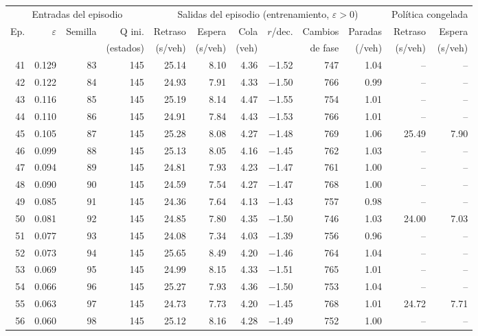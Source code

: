 \begin{table}[H]
\centering
\scriptsize
\setlength{\tabcolsep}{3pt}
\begin{tabular}{rrrrrrrrrrrr}
\toprule
\multicolumn{4}{c}{Entradas del episodio} & \multicolumn{6}{c}{Salidas del episodio (entrenamiento, $\varepsilon>0$)} & \multicolumn{2}{c}{Política congelada} \\
\cmidrule(lr){1-4}\cmidrule(lr){5-10}\cmidrule(lr){11-12}
Ep. & $\varepsilon$ & Semilla & Q ini. & Retraso & Espera & Cola & $r$/dec. & Cambios & Paradas & Retraso & Espera \\
 &  &  & (estados) & (s/veh) & (s/veh) & (veh) &  & de fase & (/veh) & (s/veh) & (s/veh) \\
\midrule
41 & 0.129 & 83 & 145 & 25.14 & 8.10 & 4.36 & $-$1.52 & 747 & 1.04 & -- & -- \\
42 & 0.122 & 84 & 145 & 24.93 & 7.91 & 4.33 & $-$1.50 & 766 & 0.99 & -- & -- \\
43 & 0.116 & 85 & 145 & 25.19 & 8.14 & 4.47 & $-$1.55 & 754 & 1.01 & -- & -- \\
44 & 0.110 & 86 & 145 & 24.91 & 7.84 & 4.43 & $-$1.53 & 766 & 1.01 & -- & -- \\
45 & 0.105 & 87 & 145 & 25.28 & 8.08 & 4.27 & $-$1.48 & 769 & 1.06 & 25.49 & 7.90 \\
46 & 0.099 & 88 & 145 & 25.13 & 8.05 & 4.16 & $-$1.45 & 762 & 1.03 & -- & -- \\
47 & 0.094 & 89 & 145 & 24.81 & 7.93 & 4.23 & $-$1.47 & 761 & 1.00 & -- & -- \\
48 & 0.090 & 90 & 145 & 24.59 & 7.54 & 4.27 & $-$1.47 & 768 & 1.00 & -- & -- \\
49 & 0.085 & 91 & 145 & 24.36 & 7.64 & 4.13 & $-$1.43 & 757 & 0.98 & -- & -- \\
50 & 0.081 & 92 & 145 & 24.85 & 7.80 & 4.35 & $-$1.50 & 746 & 1.03 & 24.00 & 7.03 \\
51 & 0.077 & 93 & 145 & 24.08 & 7.34 & 4.03 & $-$1.39 & 756 & 0.96 & -- & -- \\
52 & 0.073 & 94 & 145 & 25.65 & 8.49 & 4.20 & $-$1.46 & 764 & 1.04 & -- & -- \\
53 & 0.069 & 95 & 145 & 24.99 & 8.15 & 4.33 & $-$1.51 & 765 & 1.01 & -- & -- \\
54 & 0.066 & 96 & 145 & 25.27 & 7.93 & 4.36 & $-$1.50 & 753 & 1.04 & -- & -- \\
55 & 0.063 & 97 & 145 & 24.73 & 7.73 & 4.20 & $-$1.45 & 768 & 1.01 & 24.72 & 7.71 \\
56 & 0.060 & 98 & 145 & 25.12 & 8.16 & 4.28 & $-$1.49 & 752 & 1.00 & -- & -- \\

\end{tabular}
\end{table}
